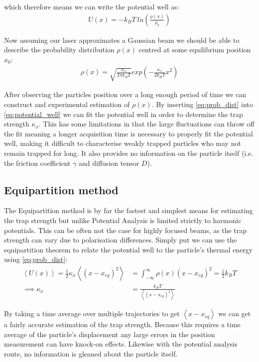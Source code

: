 which therefore means we can write the potential well as:
\begin{align}
	\label{eq:potential_well}
	U(x)=-k_BT\ ln\left(\frac{\rho(x)}{\rho_0} \right)
\end{align}

Now assuming our laser approximates a Gaussian beam we 
should be able to describe the probability distribution 
$\rho(x)$ centred at some equilibrium position $x_0$:
\begin{align}
	\label{eq:prob_dist}
	\rho(x)= \sqrt{\frac{\kappa_x}{2\pi k_BT}} exp\left(-\frac{\kappa_x}{2k_BT}x^2\right)
\end{align}

After observing the particles position over a long enough
period of time we can construct and experimental estimation
of $\rho(x)$. By inserting \eqref{eq:prob_dist} into 
\eqref{eq:potential_well} we can fit the potential well in 
order to determine the trap strength $\kappa_x$. This has 
some limitations in that the large fluctuations can throw 
off the fit meaning a longer acquisition time is necessary 
to properly fit the potential well, making it difficult to 
characterise weakly trapped particles who may not remain 
trapped for long. It also provides no information on the 
particle itself (i.e. the friction coefficient $\gamma$ and 
diffusion tensor $D$).

\subsection{Equipartition method}
The Equipartition method is by far the fastest and simplest means 
for estimating the trap strength but unlike Potential Analysis is 
limited strictly to harmonic potentials. This can be often not the 
case for highly focused beams, as the trap strength can vary due to 
polarisation differences. Simply put we can use the equipartition 
theorem to relate the potential well to the particle's thermal 
energy using \eqref{eq:prob_dist}:
\begin{align}
	\left<U(x)\right> = \frac{1}{2}\kappa_x\left<(x-x_{eq})^2\right> &= \int_{-\infty}^{\infty}\rho(x)(x-x_{eq})^2 = \frac{1}{2}k_BT \\
	\implies \kappa_x &= \frac{k_BT}{\left<(x-x_{eq})^2\right>} 
\end{align}

By taking a time average over multiple trajectories to get 
$\left<x-x_{eq}\right>$ we can get a fairly accurate estimation 
of the trap strength. Because this requires a time average of 
the particle's displacement any large errors in the position 
measurement can have knock-on effects. Likewise with the potential 
analysis route, no information is gleaned about the particle itself.

